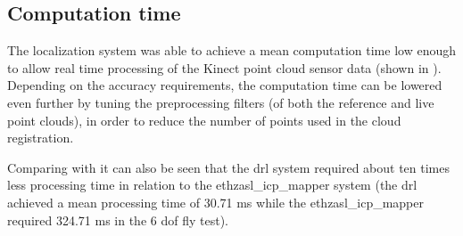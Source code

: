 %
%



\subsection{Computation time}

The localization system was able to achieve a mean computation time low enough to allow real time processing of the Kinect point cloud sensor data (shown in ). Depending on the accuracy requirements, the computation time can be lowered even further by tuning the preprocessing filters (of both the reference and live point clouds), in order to reduce the number of points used in the cloud registration.

Comparing  with  it can also be seen that the \gls{drl} system required about ten times less processing time in relation to the ethzasl\_icp\_mapper system (the \gls{drl} achieved a mean processing time of 30.71 ms while the ethzasl\_icp\_mapper required 324.71 ms in the 6 \gls{dof} fly test).


